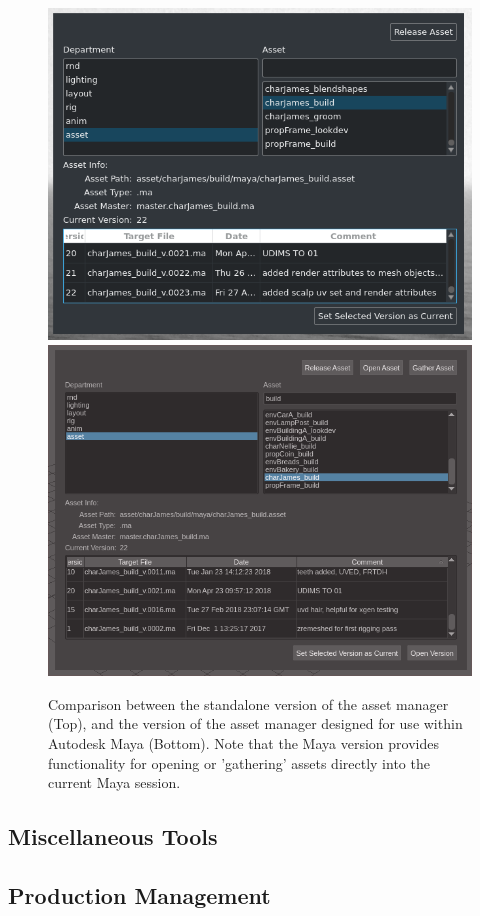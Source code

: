 \documentclass[11pt]{article}
\begin{document}
\begin{figure}[htbp]
\centering
\includegraphics[width=0.8\linewidth]{images/amStandalone.png}
\includegraphics[width=0.8\linewidth]{images/amGuiMaya.png}
\caption{\label{figure:assetManagerGui} Comparison between the standalone version of the asset manager (Top), and the version of the asset manager designed for use within Autodesk Maya (Bottom). Note that the Maya version provides functionality for opening or 'gathering' assets directly into the current Maya session.}
\end{figure}

\subsection{Miscellaneous Tools}


\subsection{Production Management}
\end{document}
